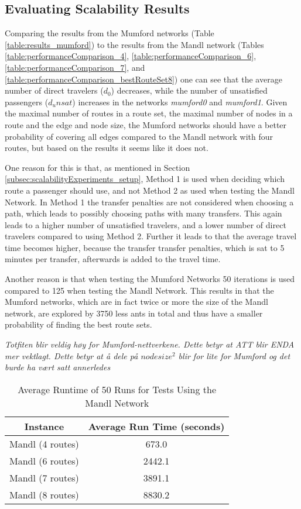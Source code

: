 \subsection{Evaluating Scalability Results}

Comparing the results from the Mumford networks (Table \vref{table:results_mumford}) to the results from the Mandl network (Tables \vref{table:performanceComparison_4}, \vref{table:performanceComparison_6}, \vref{table:performanceComparison_7}, and \vref{table:performanceComparison_bestRouteSet8}) one can see that the average number of direct travelers ($d_0$) decreases, while the number of unsatisfied passengers ($d_unsat$) increases in the networks \textit{mumford0} and \textit{mumford1}. Given the maximal number of routes in a route set, the maximal number of nodes in a route and the edge and node size, the Mumford networks should have a better probability of covering all edges compared to the Mandl network with four routes, but based on the results it seems like it does not. 

One reason for this is that, as mentioned in Section \vref{subsec:scalabilityExperiments_setup}, Method 1 is used when deciding which route a passenger should use, and not Method 2 as used when testing the Mandl Network. In Method 1 the transfer penalties are not considered when choosing a path, which leads to possibly choosing paths with many transfers. This again leads to a higher number of unsatisfied travelers, and a lower number of direct travelers compared to using Method 2. Further it leads to that the average travel time becomes higher, because the transfer transfer penalties, which is sat to 5 minutes per transfer, afterwards is added to the travel time. 

Another reason is that when testing the Mumford Networks 50 iterations is used compared to 125 when testing the Mandl Network. This results in that the Mumford networks, which are in fact twice or more the size of the Mandl network, are explored by 3750 less ants in total and thus have a smaller probability of finding the best route sets.  

\emph{\color{blue} Totfiten blir veldig høy for Mumford-nettverkene. Dette betyr at ATT blir ENDA mer vektlagt. Dette betyr at å dele på $nodesize^2$ blir for lite for Mumford og det burde ha vært satt annerledes}


\begin{table}[H]
    \centering
    \hspace*{-1.0cm}
    \begin{tabular}{|c|c|}
        \hline
        Instance & Average Run Time (seconds)\\
        \hline
        Mandl (4 routes) & 673.0\\
        \hline
        Mandl (6 routes) & 2442.1\\
        \hline
        Mandl (7 routes) & 3891.1\\
        \hline
        Mandl (8 routes) & 8830.2\\
        \hline
    \end{tabular}
    \caption{Average Runtime of 50 Runs for Tests Using the Mandl Network}
    \label{tabel:runTimeMandl}
\end{table}


